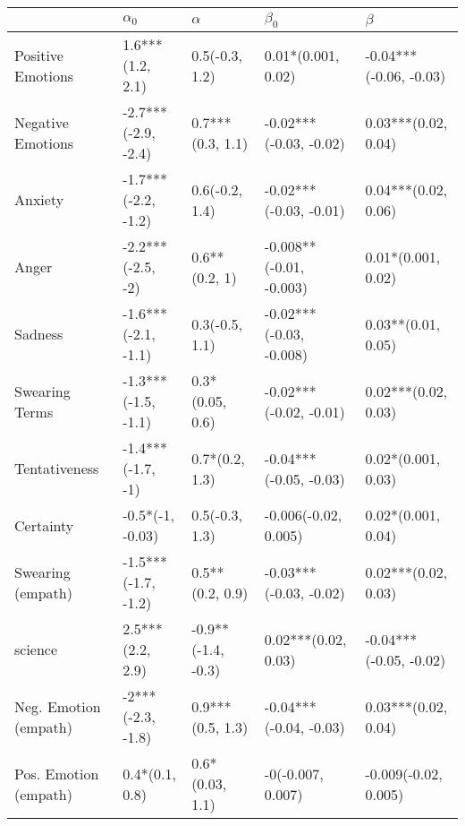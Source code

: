 \begin{tabular}{lllll}
\toprule
{} &           $\alpha_0$ &            $\alpha$ &                $\beta_0$ &                 $\beta$ \\
\midrule
Positive Emotions     &     1.6***(1.2, 2.1) &      0.5(-0.3, 1.2) &       0.01*(0.001, 0.02) &  -0.04***(-0.06, -0.03) \\
Negative Emotions     &  -2.7***(-2.9, -2.4) &    0.7***(0.3, 1.1) &   -0.02***(-0.03, -0.02) &     0.03***(0.02, 0.04) \\
Anxiety               &  -1.7***(-2.2, -1.2) &      0.6(-0.2, 1.4) &   -0.02***(-0.03, -0.01) &     0.04***(0.02, 0.06) \\
Anger                 &    -2.2***(-2.5, -2) &       0.6**(0.2, 1) &  -0.008**(-0.01, -0.003) &      0.01*(0.001, 0.02) \\
Sadness               &  -1.6***(-2.1, -1.1) &      0.3(-0.5, 1.1) &  -0.02***(-0.03, -0.008) &      0.03**(0.01, 0.05) \\
Swearing Terms        &  -1.3***(-1.5, -1.1) &     0.3*(0.05, 0.6) &   -0.02***(-0.02, -0.01) &     0.02***(0.02, 0.03) \\
Tentativeness         &    -1.4***(-1.7, -1) &      0.7*(0.2, 1.3) &   -0.04***(-0.05, -0.03) &      0.02*(0.001, 0.03) \\
Certainty             &     -0.5*(-1, -0.03) &      0.5(-0.3, 1.3) &     -0.006(-0.02, 0.005) &      0.02*(0.001, 0.04) \\
Swearing (empath)     &  -1.5***(-1.7, -1.2) &     0.5**(0.2, 0.9) &   -0.03***(-0.03, -0.02) &     0.02***(0.02, 0.03) \\
science               &     2.5***(2.2, 2.9) &  -0.9**(-1.4, -0.3) &      0.02***(0.02, 0.03) &  -0.04***(-0.05, -0.02) \\
Neg. Emotion (empath) &    -2***(-2.3, -1.8) &    0.9***(0.5, 1.3) &   -0.04***(-0.04, -0.03) &     0.03***(0.02, 0.04) \\
Pos. Emotion (empath) &       0.4*(0.1, 0.8) &     0.6*(0.03, 1.1) &        -0(-0.007, 0.007) &    -0.009(-0.02, 0.005) \\
\bottomrule
\end{tabular}
